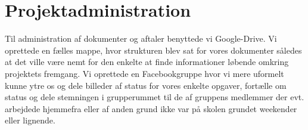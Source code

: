 \section{Projektadministration}

Til administration af dokumenter og aftaler benyttede vi Google-Drive. Vi oprettede en fælles mappe, hvor strukturen blev sat for vores dokumenter således at det ville være nemt for den enkelte at finde informationer løbende omkring projektets fremgang.
Vi oprettede en Facebookgruppe hvor vi mere uformelt kunne ytre os og dele billeder af status for vores enkelte opgaver, fortælle om status og dele stemningen i grupperummet til de af gruppens medlemmer der evt. arbejdede hjemmefra eller af anden grund ikke var på skolen grundet weekender eller lignende.